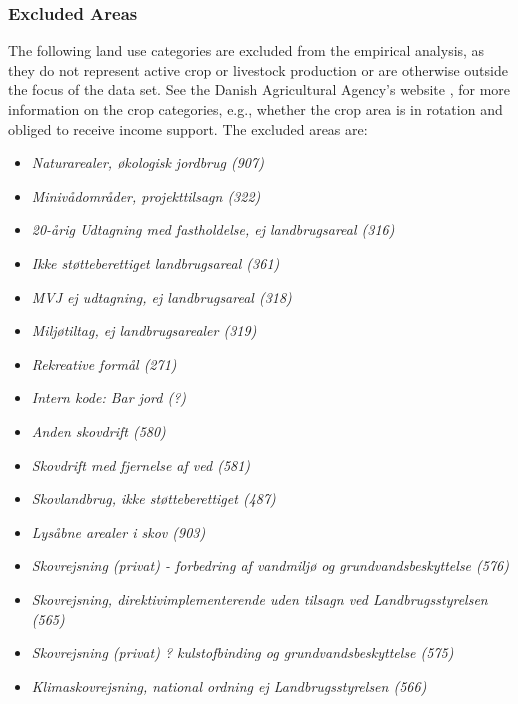 \documentclass[12pt]{article}
\begin{document}
\subsubsection{Excluded Areas}
\label{sec:excluded-areas}
The following land use categories are excluded from the empirical analysis, as they do not represent active crop or livestock production or are otherwise outside the focus of the data set.
See the Danish Agricultural Agency's website \citep{landbrugsstyrelsen2026e}, for more information on the crop categories, e.g., whether the crop area is in rotation and obliged to receive income support.
The excluded areas are:
\begin{itemize} 
    \item \textit{Naturarealer, økologisk jordbrug (907)}
    \item \textit{Minivådområder, projekttilsagn (322)}
    \item \textit{20-årig Udtagning med fastholdelse, ej landbrugsareal (316)}
    \item \textit{Ikke støtteberettiget landbrugsareal (361)}
    \item \textit{MVJ ej udtagning, ej landbrugsareal (318)}
    \item \textit{Miljøtiltag, ej landbrugsarealer (319)}
    \item \textit{Rekreative formål (271)}
    \item \textit{Intern kode: Bar jord (?)}
    \item \textit{Anden skovdrift (580)}
    \item \textit{Skovdrift med fjernelse af ved (581)}
    \item \textit{Skovlandbrug, ikke støtteberettiget (487)}
    \item \textit{Lysåbne arealer i skov (903)}
    \item \textit{Skovrejsning (privat) - forbedring af vandmiljø og grundvandsbeskyttelse (576)}
    \item \textit{Skovrejsning, direktivimplementerende uden tilsagn ved Landbrugsstyrelsen (565)}
    \item \textit{Skovrejsning  (privat) ? kulstofbinding og grundvandsbeskyttelse (575)}
    \item \textit{Klimaskovrejsning, national ordning ej Landbrugsstyrelsen (566)}
\end{itemize}
\end{document}

